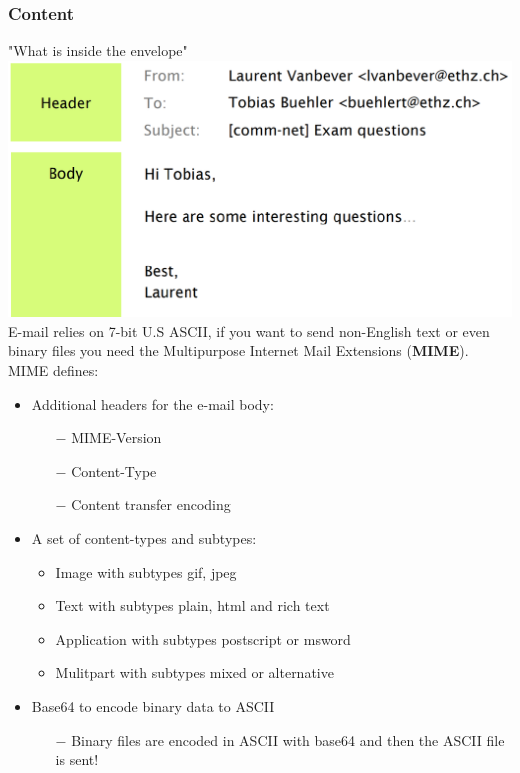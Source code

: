\documentclass[a4paper, fontsize=8pt, landscape, DIV=1]{scrartcl}
\begin{document}
\begin{multicols*}{4}
		\subsubsection{Content}
		"What is inside the envelope"\\
		\includegraphics[width=\columnwidth]{images/Application_Layer/email_content.png}
		E-mail relies on 7-bit U.S ASCII, if you want to send non-English text or even binary files you need the Multipurpose Internet Mail Extensions (\textbf{MIME}). MIME defines: 
		\begin{itemize}[noitemsep]
			\item Additional headers for the e-mail body:
			\begin{itemize}
				\item[$-$] MIME-Version
				\item[$-$] Content-Type
				\item[$-$] Content transfer encoding
			\end{itemize}
			\item A set of content-types and subtypes:
			\begin{itemize}
				\item Image with subtypes gif, jpeg
				\item Text with subtypes plain, html and rich text
				\item Application with subtypes postscript or msword
				\item Mulitpart with subtypes mixed or alternative
			\end{itemize}
			\item Base64 to encode binary data to ASCII
			\begin{itemize}
				\item[$-$] Binary files are encoded in ASCII with base64 and then the ASCII file is sent!
			\end{itemize}
		\end{itemize}
		

\end{multicols*}
\end{document}
